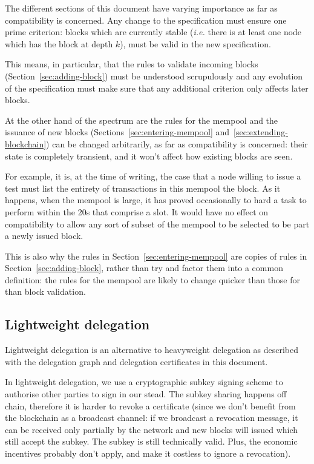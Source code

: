 \documentclass{article}
\begin{document}
The different sections of this document have varying importance as far
as compatibility is concerned. Any change to the specification must
ensure one prime criterion: blocks which are currently stable
(\emph{i.e.} there is at least one node which has the block at depth
$k$), must be valid in the new specification.

This means, in particular, that the rules to validate incoming blocks
(Section~\ref{sec:adding-block}) must be understood scrupulously and
any evolution of the specification must make sure that any additional
criterion only affects later blocks.

At the other hand of the spectrum are the rules for the mempool and
the issuance of new blocks (Sections~\ref{sec:entering-mempool}
and~\ref{sec:extending-blockchain}) can be changed arbitrarily, as far
as compatibility is concerned: their state is completely transient,
and it won't affect how existing blocks are seen.

For example, it is, at the time of writing, the case that a node
willing to issue a test must list the entirety of transactions in this
mempool the block. As it happens, when the mempool is large, it has
proved occasionally to hard a task to perform within the 20s that
comprise a slot. It would have no effect on compatibility to allow any
sort of subset of the mempool to be selected to be part a newly issued
block.

This is also why the rules in Section~\ref{sec:entering-mempool} are
copies of rules in Section~\ref{sec:adding-block}, rather than try and
factor them into a common definition: the rules for the mempool are
likely to change quicker than those for than block validation.

\subsection{Lightweight delegation}
\label{sec:lightweight-delegation}

Lightweight delegation is an alternative to heavyweight delegation as
described with the delegation graph and delegation certificates in
this document.

In lightweight delegation, we use a cryptographic subkey signing
scheme to authorise other parties to sign in our stead. The subkey
sharing happens off chain, therefore it is harder to revoke a
certificate (since we don't benefit from the blockchain as a broadcast
channel: if we broadcast a revocation message, it can be received only
partially by the network and new blocks will issued which still accept
the subkey. The subkey is still technically valid. Plus, the economic
incentives probably don't apply, and make it costless to ignore a
revocation).
\end{document}
